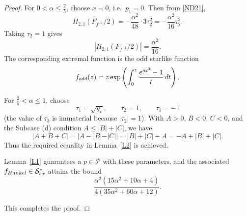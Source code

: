 \documentclass[10pt,a4paper]{amsart}
\numberwithin{equation}{section}
\begin{document}
\begin{proof}
For $0<\alpha\le \frac25$, choose $x=0$, i.e.\ $p_1=0$. Then from \eqref{ND21},
\[
H_{2,1}(F_{f^{-1}}/2)
=
-\frac{\alpha^2}{48}\cdot 3\tau_2^2
=
-\frac{\alpha^2}{16}\tau_2^2.
\]
Taking $\tau_2=1$ gives
\[
|H_{2,1}(F_{f^{-1}}/2)|=\frac{\alpha^2}{16}.
\]
The corresponding extremal function is the odd starlike function
\[
f_{\rm odd}(z)
=
z\exp\left(
\int_0^z \frac{e^{\alpha t^2}-1}{t}\,dt
\right).
\]

For $\frac25<\alpha\le 1$, choose
\[
\tau_1=\sqrt{y_v},
\qquad
\tau_2=1,
\qquad
\tau_3=-1
\]
(the value of $\tau_3$ is immaterial because $|\tau_2|=1$). With $A>0$, $B<0$, $C<0$, and the Subcase (d) condition $A\le |B|+|C|$, we have
\[
|A+B+C|
=
|A-|B|-|C||
=
|B|+|C|-A
=
-A+|B|+|C|.
\]
Thus the required equality in Lemma~\ref{L2} is achieved.

Lemma~\ref{L1} guarantees a $p\in\mathcal{P}$ with these parameters, and the associated $f_{\rm Hankel}\in\mathcal{S}_{ex}^{\ast}$ attains the bound
\[
\frac{\alpha^2(15\alpha^2+10\alpha+4)}{4(35\alpha^2+60\alpha+12)}.
\]

This completes the proof.
\end{proof}
\end{document}
